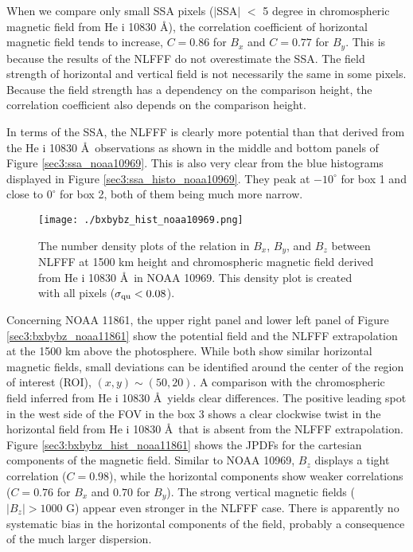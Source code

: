 \documentclass[manuscript]{aastex61}
\begin{document}
 When we compare only small SSA pixels ($|$SSA$|$ $<$ 5 degree in chromospheric magnetic field from He {\sc i} 10830 \AA), the correlation coefficient of horizontal magnetic field tends to increase, $C=0.86$ for $B_x$ and $C=0.77$ for $B_y$. 
 This is because the results of the NLFFF do not overestimate the SSA. 
 The field strength of horizontal and vertical field is not necessarily the same in some pixels. 
 Because the field strength has a dependency on the comparison height, the correlation coefficient also depends on the comparison height. 


 In terms of the SSA, the NLFFF is clearly more potential than that derived from the He {\sc i} 10830 \AA\ observations as shown in the middle and bottom panels of Figure \ref{sec3:ssa_noaa10969}. 
This is also very clear from the blue histograms displayed in Figure
\ref{sec3:ssa_histo_noaa10969}. They peak at $-10^\circ$ for box 1 and
close to $0^\circ$ for box 2, both of them being much more narrow.
\begin{figure}
\texttt{[image: ./bxbybz\_hist\_noaa10969.png]}
\caption{The number density plots of the relation in $B_x$, $B_y$, and $B_z$ between NLFFF at 1500 km height and chromospheric magnetic field derived from He {\sc i} 10830 \AA \ in NOAA 10969.  This density plot is created with all pixels ($\sigma_{\rm qu}<0.08$).}
\label{sec3:bxbybz_hist_noaa10969}
\end{figure}

Concerning NOAA 11861, the upper right panel and lower left panel of Figure
\ref{sec3:bxbybz_noaa11861} show the potential field and the NLFFF extrapolation
at the 1500 km above the photosphere. While both show similar horizontal
magnetic fields, small deviations can be identified around
the center of the region of interest (ROI), $(x,y)\sim(50,20)$. A comparison with the 
chromospheric field inferred from He {\sc i} 10830 \AA\ yields clear
differences. 
The positive leading spot in the west side of the FOV in the box 3 shows a clear clockwise twist in the horizontal field from He {\sc i} 10830 \AA \ that
is absent from the NLFFF extrapolation. Figure
\ref{sec3:bxbybz_hist_noaa11861} shows the JPDFs for the cartesian
components of the magnetic field. Similar to
NOAA 10969, $B_z$ displays a tight correlation ($C=0.98$), while the horizontal components
show weaker correlations ($C=0.76$ for $B_x$ and $0.70$ for $B_y$). 
The strong vertical magnetic fields ($|B_z|>1000$ G) appear even
stronger in the NLFFF case. There is apparently no systematic bias in the 
horizontal components of the field, probably a consequence
of the much larger dispersion.
\end{document}
